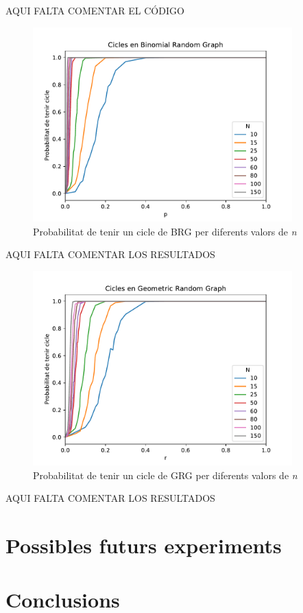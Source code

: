 AQUI FALTA COMENTAR EL CÓDIGO

\begin{figure}[H]
    \centering
    \includegraphics[width=10cm]{plots/BRG_cicle.pdf}
    \caption{Probabilitat de tenir un cicle de BRG per diferents valors de \textit{n}}
    \label{fig:connect_04}
\end{figure}

AQUI FALTA COMENTAR LOS RESULTADOS

\begin{figure}[H]
    \centering
    \includegraphics[width=10cm]{plots/GRG_cicle.pdf}
    \caption{Probabilitat de tenir un cicle de GRG per diferents valors de \textit{n}}
    \label{fig:connect_04}
\end{figure}

AQUI FALTA COMENTAR LOS RESULTADOS

\section{Possibles futurs experiments}

\section{Conclusions}

\pagebreak

\printbibliography



